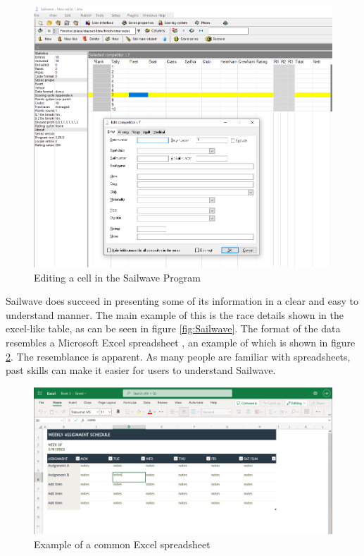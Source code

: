 \documentclass{l4proj}
\begin{document}
\begin{figure}[H]
    \centering
    \includegraphics[width=1\linewidth]{images/Sailwave_edit.png} 

    \caption{Editing a cell in the Sailwave Program \citep{sailwave}
    }

    \label{fig:SailwaveEdit} 
\end{figure}

Sailwave does succeed in presenting some of its information in a clear and easy to understand manner. The main example of this is the race details shown in the excel-like table, as can be seen in figure \ref{fig:Sailwave}. The format of the data resembles a Microsoft Excel spreadsheet \citep{Excel}, an example of which is shown in figure \ref{fig:Excel}. The resemblance is apparent. As many people are familiar with spreadsheets, past skills can make it easier for users to understand Sailwave.

\begin{figure}[H]
    \centering
    \includegraphics[width=1\linewidth]{images/Ecel.png} 

    \caption{Example of a common Excel spreadsheet \citep{Excel}
    }

    \label{fig:Excel} 
\end{figure}
\end{document}
